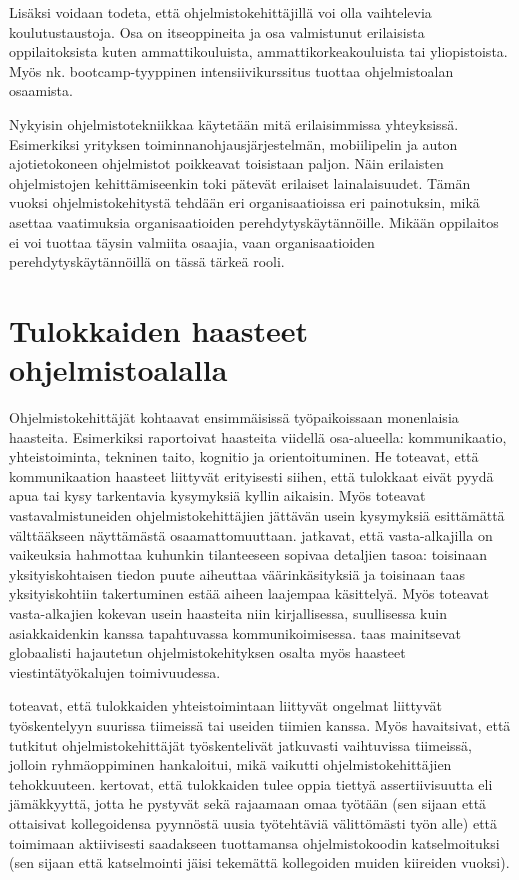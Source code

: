 \documentclass[utf8]{gradu3}
\begin{document}
Lisäksi voidaan todeta, että ohjelmistokehittäjillä voi olla vaihtelevia koulutustaustoja. Osa on itseoppineita ja osa valmistunut erilaisista oppilaitoksista kuten ammattikouluista, ammattikorkeakouluista tai yliopistoista. Myös nk. bootcamp-tyyppinen intensiivikurssitus tuottaa ohjelmistoalan osaamista. 

Nykyisin ohjelmistotekniikkaa käytetään mitä erilaisimmissa yhteyksissä. Esimerkiksi yrityksen toiminnanohjausjärjestelmän, mobiilipelin ja auton ajotietokoneen ohjelmistot poikkeavat toisistaan paljon. Näin erilaisten ohjelmistojen kehittämiseenkin toki pätevät erilaiset lainalaisuudet. Tämän vuoksi ohjelmistokehitystä tehdään eri organisaatioissa eri painotuksin, mikä asettaa vaatimuksia organisaatioiden perehdytyskäytännöille. Mikään oppilaitos ei voi tuottaa täysin valmiita osaajia, vaan organisaatioiden perehdytyskäytännöillä on tässä tärkeä rooli.

\section{Tulokkaiden haasteet ohjelmistoalalla}
\label{luku-tulokkaiden-haasteet}

Ohjelmistokehittäjät kohtaavat ensimmäisissä työpaikoissaan monenlaisia haasteita. Esimerkiksi \textcite{begel-simon-2008} raportoivat haasteita viidellä osa-alueella: kommunikaatio, yhteistoiminta, tekninen taito, kognitio ja orientoituminen. He toteavat, että kommunikaation haasteet liittyvät erityisesti siihen, että tulokkaat eivät pyydä apua tai kysy tarkentavia kysymyksiä kyllin aikaisin. Myös \textcite{radermacher-ym-2015} toteavat vastavalmistuneiden ohjelmistokehittäjien jättävän usein kysymyksiä esittämättä välttääkseen näyttämästä osaamattomuuttaan. \textcite{begel-simon-2008} jatkavat, että vasta-alkajilla on vaikeuksia hahmottaa kuhunkin tilanteeseen sopivaa detaljien tasoa: toisinaan yksityiskohtaisen tiedon puute aiheuttaa väärinkäsityksiä ja toisinaan taas yksityiskohtiin takertuminen estää aiheen laajempaa käsittelyä. Myös \textcite{radermacher-ym-2015} toteavat vasta-alkajien kokevan usein haasteita niin kirjallisessa, suullisessa kuin asiakkaidenkin kanssa tapahtuvassa kommunikoimisessa. \textcite{moe-ym-2020} taas mainitsevat globaalisti hajautetun ohjelmistokehityksen osalta myös haasteet viestintätyökalujen toimivuudessa.

\textcite{begel-simon-2008} toteavat, että tulokkaiden yhteistoimintaan liittyvät ongelmat liittyvät työskentelyyn suurissa tiimeissä tai useiden tiimien kanssa. Myös \textcite{britto-ym-2019} havaitsivat, että tutkitut ohjelmistokehittäjät työskentelivät jatkuvasti vaihtuvissa tiimeissä, jolloin ryhmäoppiminen hankaloitui, mikä vaikutti ohjelmistokehittäjien tehokkuuteen. \textcite{begel-simon-2008} kertovat, että tulokkaiden tulee oppia tiettyä assertiivisuutta eli jämäkkyyttä, jotta he pystyvät sekä rajaamaan omaa työtään (sen sijaan että ottaisivat kollegoidensa pyynnöstä uusia työtehtäviä välittömästi työn alle) että toimimaan aktiivisesti saadakseen tuottamansa ohjelmistokoodin katselmoituksi (sen sijaan että katselmointi jäisi tekemättä kollegoiden muiden kiireiden vuoksi).
\end{document}
